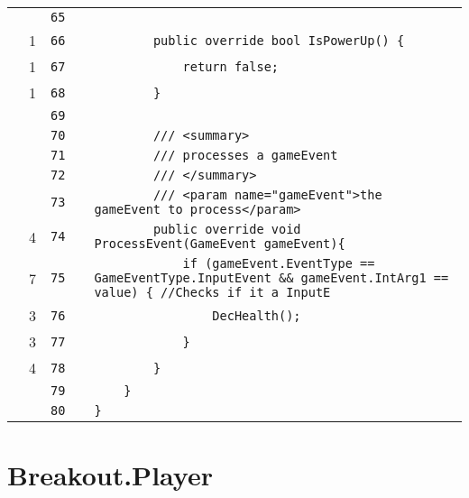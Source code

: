 \documentclass[a4paper,landscape,10pt]{article}
\begin{document}
\begin{longtable}[l]{lrrll}
\cellcolor{gray} &  & \verb~65~ & & \verb~~\\
\cellcolor{green} & 1 & \verb~66~ & & \verb~        public override bool IsPowerUp() {~\\
\cellcolor{green} & 1 & \verb~67~ & & \verb~            return false;~\\
\cellcolor{green} & 1 & \verb~68~ & & \verb~        }~\\
\cellcolor{gray} &  & \verb~69~ & & \verb~~\\
\cellcolor{gray} &  & \verb~70~ & & \verb~        /// <summary>~\\
\cellcolor{gray} &  & \verb~71~ & & \verb~        /// processes a gameEvent~\\
\cellcolor{gray} &  & \verb~72~ & & \verb~        /// </summary>~\\
\cellcolor{gray} &  & \verb~73~ & & \verb~        /// <param name="gameEvent">the gameEvent to process</param>~\\
\cellcolor{green} & 4 & \verb~74~ & & \verb~        public override void ProcessEvent(GameEvent gameEvent){~\\
\cellcolor{orange} & 7 & \verb~75~ & & \verb~            if (gameEvent.EventType == GameEventType.InputEvent && gameEvent.IntArg1 == value) { //Checks if it a InputE~\\
\cellcolor{green} & 3 & \verb~76~ & & \verb~                DecHealth();~\\
\cellcolor{green} & 3 & \verb~77~ & & \verb~            }~\\
\cellcolor{green} & 4 & \verb~78~ & & \verb~        }~\\
\cellcolor{gray} &  & \verb~79~ & & \verb~    }~\\
\cellcolor{gray} &  & \verb~80~ & & \verb~}~\\
\end{longtable}
\newpage
\section{Breakout.Player}
\end{document}
